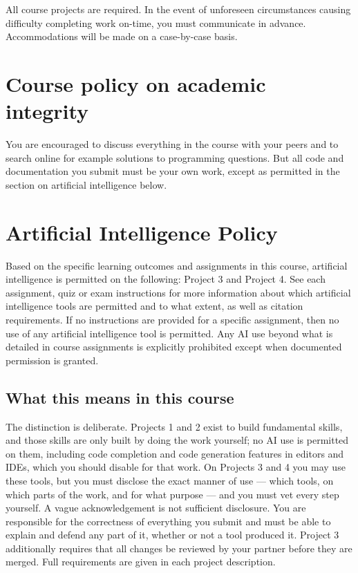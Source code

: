 \documentclass[12pt]{article}
\begin{document}
All course projects are required. In the event of unforeseen circumstances causing difficulty completing work on-time, you must communicate in advance. Accommodations will be made on a case-by-case basis.

\section*{Course policy on academic integrity}

You are encouraged to discuss everything in the course with your peers and to search online for example solutions to programming questions. But all code and documentation you submit must be your own work, except as permitted in the section on artificial intelligence below.

\section*{Artificial Intelligence Policy}

Based on the specific learning outcomes and assignments in this course, artificial intelligence is permitted on the following: Project 3 and Project 4. See each assignment, quiz or exam instructions for more information about which artificial intelligence tools are permitted and to what extent, as well as citation requirements. If no instructions are provided for a specific assignment, then no use of any artificial intelligence tool is permitted. Any AI use beyond what is detailed in course assignments is explicitly prohibited except when documented permission is granted.

\subsection*{What this means in this course}

The distinction is deliberate. Projects 1 and 2 exist to build fundamental skills, and those skills are only built by doing the work yourself; no AI use is permitted on them, including code completion and code generation features in editors and IDEs, which you should disable for that work. On Projects 3 and 4 you may use these tools, but you must disclose the exact manner of use --- which tools, on which parts of the work, and for what purpose --- and you must vet every step yourself. A vague acknowledgement is not sufficient disclosure. You are responsible for the correctness of everything you submit and must be able to explain and defend any part of it, whether or not a tool produced it. Project 3 additionally requires that all changes be reviewed by your partner before they are merged. Full requirements are given in each project description.
\end{document}
